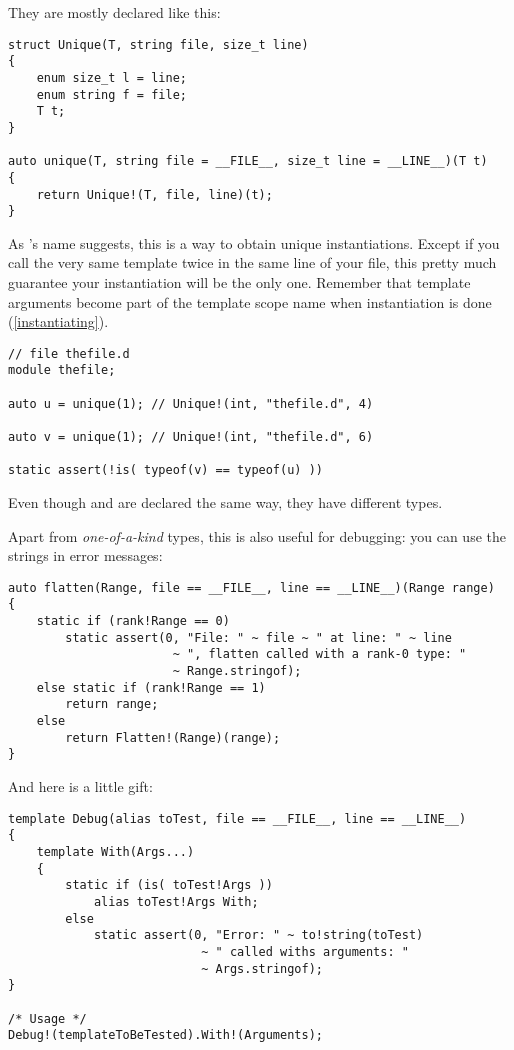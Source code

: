 They are mostly declared like this:

\begin{verbatim}
struct Unique(T, string file, size_t line)
{
    enum size_t l = line;
    enum string f = file;
    T t;
}

auto unique(T, string file = __FILE__, size_t line = __LINE__)(T t)
{
    return Unique!(T, file, line)(t);
}
\end{verbatim}

As 's name suggests, this is a way to obtain unique instantiations. Except if you call the very same template twice in the same line of your file, this pretty much guarantee your instantiation will be the only one. Remember that template arguments become part of the template scope name when instantiation is done (\ref{instantiating}).

\begin{verbatim}
// file thefile.d
module thefile;

auto u = unique(1); // Unique!(int, "thefile.d", 4)

auto v = unique(1); // Unique!(int, "thefile.d", 6)

static assert(!is( typeof(v) == typeof(u) ))
\end{verbatim}

Even though  and  are declared the same way, they have different types.

Apart from \emph{one-of-a-kind} types, this is also useful for debugging: you can use the strings in error messages:

\begin{verbatim}
auto flatten(Range, file == __FILE__, line == __LINE__)(Range range)
{ 
    static if (rank!Range == 0)
        static assert(0, "File: " ~ file ~ " at line: " ~ line 
                       ~ ", flatten called with a rank-0 type: " 
                       ~ Range.stringof);
    else static if (rank!Range == 1)
        return range;
    else
        return Flatten!(Range)(range);
}
\end{verbatim}

And here is a little gift:

\begin{verbatim}
template Debug(alias toTest, file == __FILE__, line == __LINE__)
{
    template With(Args...)
    {
        static if (is( toTest!Args ))
            alias toTest!Args With;
        else
            static assert(0, "Error: " ~ to!string(toTest)
                           ~ " called withs arguments: "
                           ~ Args.stringof);
}

/* Usage */
Debug!(templateToBeTested).With!(Arguments);
\end{verbatim}

